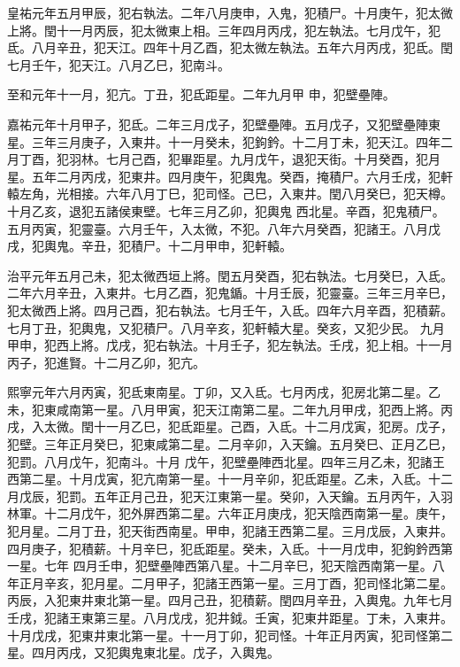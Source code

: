 \begin{pinyinscope}
 皇祐元年五月甲辰，犯右執法。二年八月庚申，入鬼，犯積尸。十月庚午，犯太微上將。閏十一月丙辰，犯太微東上相。三年四月丙戌，犯左執法。七月戊午，犯氐。八月辛丑，犯天江。四年十月乙酉，犯太微左執法。五年六月丙戌，犯氐。閏七月壬午，犯天江。八月乙巳，犯南斗。



 至和元年十一月，犯亢。丁丑，犯氐距星。二年九月甲
 申，犯壁壘陣。



 嘉祐元年十月甲子，犯氐。二年三月戊子，犯壁壘陣。五月戊子，又犯壁壘陣東星。三年三月庚子，入東井。十一月癸未，犯鉤鈐。十二月丁未，犯天江。四年二月丁酉，犯羽林。七月己酉，犯畢距星。九月戊午，退犯天街。十月癸酉，犯月星。五年二月丙戌，犯東井。四月庚午，犯輿鬼。癸酉，掩積尸。六月壬戌，犯軒轅左角，光相接。六年八月丁巳，犯司怪。己巳，入東井。閏八月癸巳，犯天樽。十月乙亥，退犯五諸侯東壁。七年三月乙卯，犯輿鬼
 西北星。辛酉，犯鬼積尸。五月丙寅，犯靈臺。六月壬午，入太微，不犯。八年六月癸酉，犯諸王。八月戊戌，犯輿鬼。辛丑，犯積尸。十二月甲申，犯軒轅。



 治平元年五月己未，犯太微西垣上將。閏五月癸酉，犯右執法。七月癸巳，入氐。二年六月辛丑，入東井。七月乙酉，犯鬼鍎。十月壬辰，犯靈臺。三年三月辛巳，犯太微西上將。四月己酉，犯右執法。七月壬午，入氐。四年六月辛酉，犯積薪。七月丁丑，犯輿鬼，又犯積尸。八月辛亥，犯軒轅大星。癸亥，又犯少民。
 九月甲申，犯西上將。戊戌，犯右執法。十月壬子，犯左執法。壬戌，犯上相。十一月丙子，犯進賢。十二月乙卯，犯亢。



 熙寧元年六月丙寅，犯氐東南星。丁卯，又入氐。七月丙戌，犯房北第二星。乙未，犯東咸南第一星。八月甲寅，犯天江南第二星。二年九月甲戌，犯西上將。丙戌，入太微。閏十一月乙巳，犯氐距星。己酉，入氐。十二月戊寅，犯房。戊子，犯壁。三年正月癸巳，犯東咸第二星。二月辛卯，入天鑰。五月癸巳、正月乙巳，犯罰。八月戊午，犯南斗。十月
 戊午，犯壁壘陣西北星。四年三月乙未，犯諸王西第二星。十月戊寅，犯亢南第一星。十一月辛卯，犯氐距星。乙未，入氐。十二月戊辰，犯罰。五年正月己丑，犯天江東第一星。癸卯，入天鑰。五月丙午，入羽林軍。十二月戊午，犯外屏西第二星。六年正月庚戌，犯天陰西南第一星。庚午，犯月星。二月丁丑，犯天街西南星。甲申，犯諸王西第二星。三月戊辰，入東井。四月庚子，犯積薪。十月辛巳，犯氐距星。癸未，入氐。十一月戊申，犯鉤鈐西第一星。七年
 四月壬申，犯壁壘陣西第八星。十二月辛巳，犯天陰西南第一星。八年正月辛亥，犯月星。二月甲子，犯諸王西第一星。三月丁酉，犯司怪北第二星。丙辰，入犯東井東北第一星。四月己丑，犯積薪。閏四月辛丑，入輿鬼。九年七月壬戌，犯諸王東第三星。八月戊戌，犯井鉞。壬寅，犯東井距星。丁未，入東井。十月戊戌，犯東井東北第一星。十一月丁卯，犯司怪。十年正月丙寅，犯司怪第二星。四月丙戌，又犯輿鬼東北星。戊子，入輿鬼。




\end{pinyinscope}
